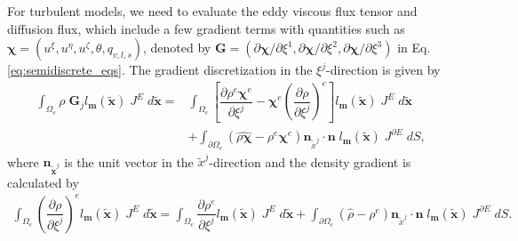 For turbulent models,  
we need to evaluate 
the eddy viscous flux tensor and diffusion flux, 
which include a few gradient terms with quantities such as $\bm{\chi}=(u^\xi,u^\eta,u^\zeta,\theta,q_{v,l,s})$, 
denoted by 
$\bm{G}=(\partial \bm{\chi}/\partial\xi^1,\partial \bm{\chi}/\partial\xi^2,\partial \bm{\chi}/\partial\xi^3)$ 
in Eq.\,\eqref{eq:semidiscrete_eqs}. 
The gradient discretization in the $\xi^j$-direction is given by 
\begin{align}
  \int_{\Omega_e} \rho \; \bm{G}_j l_{\bm{m}} (\tilde{\bm{x}}) \; J^E \; d\tilde{\bm{x}}
  =  
  &  \int_{\Omega_e} \left[\dfrac{\partial \rho^e \bm{\chi}^e}{\partial \xi^j} - \bm{\chi}^e  \left(\dfrac{\partial \rho}{\partial \xi^j}\right)^e \right] l_{\bm{m}} (\tilde{\bm{x}}) \; J^E \; d\tilde{\bm{x}} \nonumber \\
  &+ \int_{\partial \Omega_{e}} \left( \widehat{\rho\bm{\chi}} - \rho^e \bm{\chi}^e \right)\bm{n}_{\tilde{x}^j}  \cdot \bm{n} \; l_{\bm{m}} (\tilde{\bm{x}}) \; J^{\partial E} \; dS, \label{eq:semidiscrete_grad}
\end{align}
where 
$\bm{n}_{\tilde{\bm{x}}^j}$ is the unit vector in the $\tilde{x}^j$-direction 
and  
the density gradient is calculated by
\begin{align}
  \int_{\Omega_e}  \left(\dfrac{\partial \rho}{\partial \xi^j}\right)^e l_{\bm{m}} (\tilde{\bm{x}}) \; J^E \; d\tilde{\bm{x}}
=  
    \int_{\Omega_e} \dfrac{\partial \rho^e}{\partial \xi^j} l_{\bm{m}} (\tilde{\bm{x}}) \; J^E \;  d\tilde{\bm{x}} 
  + \int_{\partial \Omega_{e}} (\hat{\rho} - \rho^e)\bm{n}_{\tilde{x}^j}  \cdot \bm{n} \; l_{\bm{m}} (\tilde{\bm{x}}) \; J^{\partial E} \; dS. 
\end{align}



